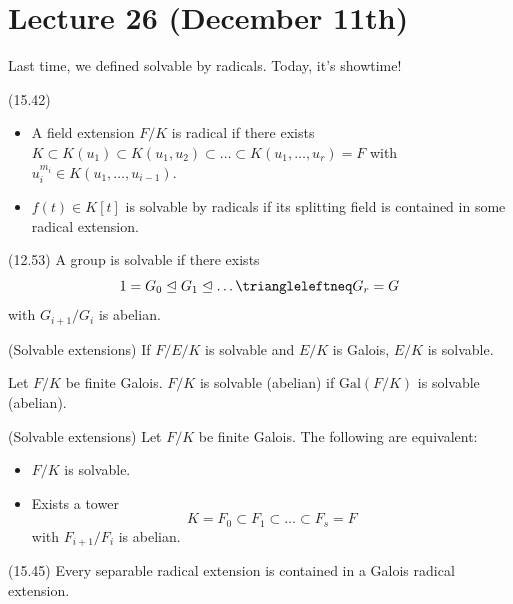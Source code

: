 \section{Lecture 26 (December 11th)} 
\begin{rmk}
Last time, we defined solvable by radicals. Today, it's showtime! 
\end{rmk}
\vspace{2ex}
\begin{defi}
(15.42)
\begin{itemize}
\item[(i)] A field extension $F/K$ is radical if there exists $K\subset K(u_{1})\subset K(u_1,u_2)\subset \ldots \subset K(u_1,\ldots ,u_{r})=F$ with $u_{i}^{m_{i}}\in K(u_1,\ldots, u_{i-1})$.
\item[(ii)] $f(t)\in K[t]$ is solvable by radicals if its splitting field is contained in some radical extension.
\end{itemize}
\end{defi}
\vspace{2ex}
\begin{defi}
(12.53) A group is solvable if there exists 
\[1=G_0\trianglelefteq G_1\trianglelefteq \ldots \triangleleftneq G_{r}=G\]
with $G_{i+1}/G_{i}$ is abelian. 
\end{defi}
\vspace{2ex}
\begin{cor}
(Solvable extensions) If $F/E/K$ is solvable and $E/K$ is Galois, $E/K$ is solvable. 
\end{cor}
\vspace{2ex}
\begin{defi}
Let $F/K$ be finite Galois. $F/K$ is solvable (abelian) if $\mathrm{Gal}(F/K)$ is solvable (abelian).
\end{defi}
\vspace{2ex}
\begin{lem}
(Solvable extensions) Let $F/K$ be finite Galois. The following are equivalent:
\begin{itemize}
\item[(i)] $F/K$ is solvable.
\item[(ii)] Exists a tower
\[K=F_0\subset F_1\subset \ldots \subset F_{s}=F\]
with $F_{i+1}/F_{i}$ is abelian.
\end{itemize}
\end{lem}
\vspace{2ex}
\begin{lem}
(15.45) Every separable radical extension is contained in a Galois radical extension. 
\end{lem}
